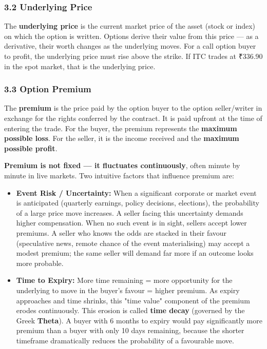 \documentclass[12pt,openany]{book}
\begin{document}
\subsubsection{3.2 Underlying Price}

The \textbf{underlying price} is the current market price of the asset (stock or index) on which the option is written. Options derive their value from this price — as a derivative, their worth changes as the underlying moves. For a call option buyer to profit, the underlying price must rise above the strike. If ITC trades at ₹336.90 in the spot market, that is the underlying price.

\subsubsection{3.3 Option Premium}

The \textbf{premium} is the price paid by the option buyer to the option seller/writer in exchange for the rights conferred by the contract. It is paid upfront at the time of entering the trade. For the buyer, the premium represents the \textbf{maximum possible loss}. For the seller, it is the income received and the \textbf{maximum possible profit}.

\textbf{Premium is not fixed — it fluctuates continuously}, often minute by minute in live markets. Two intuitive factors that influence premium are:

\begin{itemize}[leftmargin=*]
    \item \textbf{Event Risk / Uncertainty:} When a significant corporate or market event is anticipated (quarterly earnings, policy decisions, elections), the probability of a large price move increases. A seller facing this uncertainty demands higher compensation. When no such event is in sight, sellers accept lower premiums. A seller who knows the odds are stacked in their favour (speculative news, remote chance of the event materialising) may accept a modest premium; the same seller will demand far more if an outcome looks more probable.
\end{itemize}

\begin{itemize}[leftmargin=*]
    \item \textbf{Time to Expiry:} More time remaining = more opportunity for the underlying to move in the buyer's favour = higher premium. As expiry approaches and time shrinks, this "time value" component of the premium erodes continuously. This erosion is called \textbf{time decay} (governed by the Greek \textbf{Theta}). A buyer with 6 months to expiry would pay significantly more premium than a buyer with only 10 days remaining, because the shorter timeframe dramatically reduces the probability of a favourable move.
\end{itemize}
\end{document}
